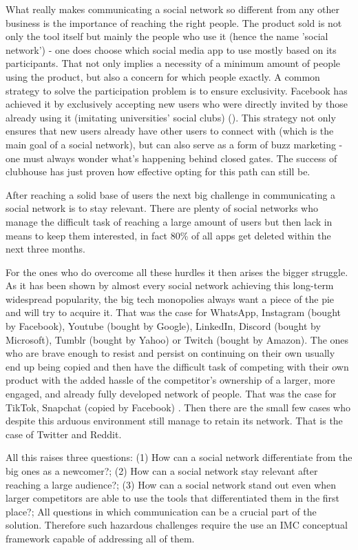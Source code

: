 \documentclass[11pt]{article}
\begin{document}
What really makes communicating a social network so different from any other business is the importance of reaching the right people. The product sold is not only the tool itself but mainly the people who use it (hence the name 'social network') - one does choose which social media app to use mostly based on its participants. That not only implies a necessity of a minimum amount of people using the product, but also a concern for which people exactly. A common strategy to solve the participation problem is to ensure exclusivity. Facebook has achieved it by exclusively accepting new users who were directly invited by those already using it (imitating universities' social clubs) (\cite{zucked}). This strategy not only ensures that new users already have other users to connect with (which is the main goal of a social network), but can also serve as a form of buzz marketing - one must always wonder what's happening behind closed gates. The success of clubhouse has just proven how effective opting for this path can still be.
 
After reaching a solid base of users the next big challenge in communicating a social network is to stay relevant.  There are plenty of social networks who manage the difficult task of reaching a large amount of users but then lack in means to keep them interested, in fact 80\% of all apps get deleted within the next three months.

For the ones who do overcome all these hurdles it then arises the bigger struggle. As it has been shown by almost every social network achieving this long-term widespread popularity, the big tech monopolies always want a piece of the pie and will try to acquire it. That was the case for WhatsApp, Instagram (bought by Facebook), Youtube (bought by Google), LinkedIn, Discord (bought by Microsoft), Tumblr (bought by Yahoo) or Twitch (bought by Amazon). The ones who are brave enough to resist and persist on continuing on their own usually end up being copied and then have the difficult task of competing with their own product with the added hassle of the competitor's ownership of a larger, more engaged, and already fully developed network of people. That was the case for TikTok, Snapchat (copied by Facebook) . Then there are the small few cases who despite this arduous environment still manage to retain its network. That is the case of Twitter and Reddit.

All this raises three questions: (1) How can a social network differentiate from the big ones as a newcomer?; (2) How can a social network stay relevant after reaching a large audience?; (3) How can a social network stand out even when larger competitors are able to use the tools that differentiated them in the first place?; All questions in which communication can be a crucial part of the solution. Therefore such hazardous challenges require the use an IMC conceptual framework capable of addressing all of them.
\end{document}
